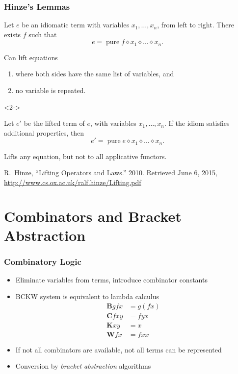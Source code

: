 \documentclass[smaller,leqno]{beamer}
\newenvironment{reference}{\begingroup\scriptsize\singlespacing\color{gray}}{\par\endgroup}
\DeclareMathOperator{\pure}{pure}
\newcommand{\ap}{\diamond}
\begin{document}
\begin{frame}
\frametitle{Hinze's Lemmas}

\begin{lemma}
Let $e$ be an idiomatic term with variables $x_1,\dots,x_n$, from left to right.
There exists $f$ such that
\[ e = \pure f \ap x_1 \ap \dots \ap x_n. \]
\end{lemma}

Can lift equations
\begin{enumerate}
\item where both sides have the same list of variables, and
\item no variable is repeated.
\end{enumerate}

\begin{uncoverenv}<2->
\vspace{5mm}
\begin{lemma}
Let $e'$ be the lifted term of $e$, with variables $x_1,\dots,x_n$.
If the idiom satisfies additional properties, then
\[ e' = \pure e \ap x_1 \ap \dots \ap x_n.  \]
\end{lemma}

Lifts any equation, but not to all applicative functors.
\end{uncoverenv}

\vspace{\fill}
\begin{reference}
R.\ Hinze, ``Lifting Operators and Laws.'' 2010. Retrieved June 6, 2015,
\url{http://www.cs.ox.ac.uk/ralf.hinze/Lifting.pdf}
\end{reference}
\end{frame}

\section{Combinators and Bracket Abstraction} %

\begin{frame}
\frametitle{Combinatory Logic}

\begin{itemize}
\item Eliminate variables from terms, introduce combinator constants
\item BCKW system is equivalent to lambda calculus
\begin{align*}
\mathbf{B} g f x &= g (f x) \\
\mathbf{C} f x y &= f y x \\
\mathbf{K} x y &= x \\
\mathbf{W} f x &= f x x
\end{align*}
\pause
\item If not all combinators are available, not all terms can be represented
\item Conversion by \emph{bracket abstraction} algorithms
\end{itemize}
\end{frame}
\end{document}

